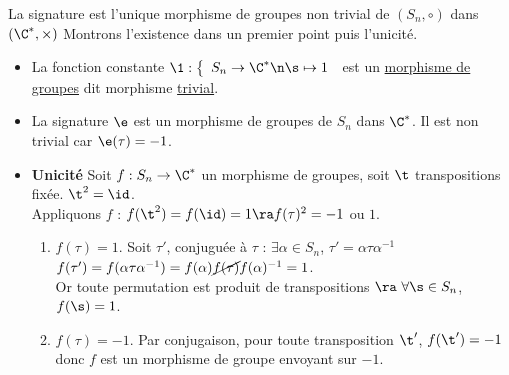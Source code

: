 \documentclass[11pt]{article}
\begin{document}
\begin{corr}{}{}
    La signature est l'unique morphisme de groupes non trivial de $(S_{n}, \circ)$ dans $(\C^{*}, \times)$
    \tcblower
    Montrons l'existence dans un premier point puis l'unicité.
    \begin{itemize}[topsep=0pt,itemsep=-0.9 ex]
        \item La fonction constante
        $\1 : \left\{ \begin{array}{ll}
             S_{n} \to \C^{*}  \n
             \s \mapsto 1
        \end{array}\right.$ est un \underline{morphisme de groupes} dit morphisme \underline{trivial}.
        \item La signature $\e$ est un morphisme de groupes de $S_{n}$ dans $\C^{*}$. Il est non trivial car $\e(\tau) = -1$.
        \item \textbf{Unicité} Soit $f : S_{n} \to \C^{*}$ un morphisme de groupes, soit $\t$ transpositions fixée. $\t^2 = \id$.\\
        Appliquons $f$ : $f(\t^2) = f(\id) = 1 \ra f(\tau)^{2} = -1$ ou $1$.
        \begin{enumerate}[topsep=0pt,itemsep=-0.7 ex]
            \item $f(\tau) = 1$. Soit $\tau'$, conjuguée à $\tau$ : $\exists \alpha \in S_{n}$, $\tau' = \alpha \tau \alpha^{-1}$
            $f(\tau') = f(\alpha \tau \alpha^{-1}) = f(\alpha) \cancel{f(\tau)} f(\alpha)^{-1} = 1$.\\
            Or toute permutation est produit de transpositions $\ra ~ \forall \s \in S_{n}$, $f(\s) = 1$.
            \item $f(\tau) = -1$. Par conjugaison, pour toute transposition $\t'$, $f(\t') = -1$ donc $f$ est un morphisme de groupe envoyant sur $-1$.
        \end{enumerate}
    \end{itemize}
\end{corr}
\end{document}
